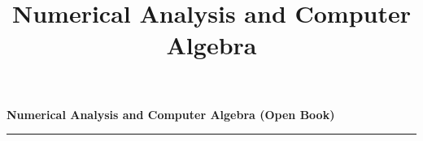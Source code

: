 \documentclass[10pt,landscape]{article}
\title{Numerical Analysis and Computer Algebra}
\begin{document}
    \raggedright
    \footnotesize

    \begin{center}
        \textbf{Numerical Analysis and Computer Algebra (Open Book)} \\
    \end{center}
    \begin{multicols}{3}
        \setlength{\premulticols}{1pt}
        \setlength{\postmulticols}{1pt}
        \setlength{\multicolsep}{1pt}
        \setlength{\columnsep}{2pt}

        

        \hspace{1cm}
		\hrule

        \newpage
        
    \end{multicols}
\end{document}
